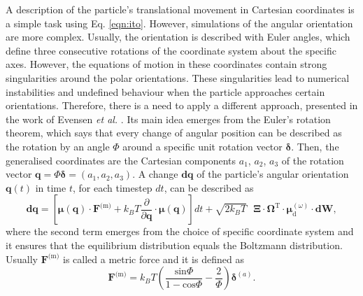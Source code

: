 \documentclass{master_thesis}
\begin{document}
A description of the particle's translational movement in Cartesian coordinates is a simple task using Eq. \eqref{eqn:ito}. However, simulations of the angular orientation are more complex. Usually, the orientation is described with Euler angles, which define three consecutive rotations of the coordinate system about the specific axes. However, the equations of motion in these coordinates contain strong singularities around the polar orientations. These singularities lead to numerical instabilities and undefined behaviour when the particle approaches certain orientations. Therefore, there is a need to apply a different approach, presented in the work of Evensen \textit{et al.} \cite{evensen2008}. Its main idea emerges from the Euler's rotation theorem, which says that every change of angular position can be described as the rotation by an angle $\Phi$ around a specific unit rotation vector $\bm{\delta}$. Then, the generalised coordinates are the Cartesian components $a_1$, $a_2$, $a_3$ of the rotation vector $\boldsymbol{q} = \Phi \bm{\delta} = \left( a_1, a_2, a_3 \right)$. A change $\boldsymbol{dq}$ of the particle's angular orientation $\boldsymbol{q}(t)$ in time $t$, for each timestep $dt$, can be described as
\begin{equation}
    \boldsymbol{dq} = \left[\bm{\mu}(\boldsymbol{q})\cdot \boldsymbol{F}^{\textrm{(m)}} + k_BT \frac{\partial}{\partial\boldsymbol{q}}\cdot\bm{\mu}(\boldsymbol{q}) \right] dt    +\sqrt{2k_BT}\textrm{ }\bm{\Xi}\cdot\bm{\Omega}^\textrm{T}\cdot\bm{\mu}^{(\omega)}_{\textrm{d}}\cdot\boldsymbol{dW},
\label{eqn:rotational_timestep}
\end{equation}
where the second term emerges from the choice of specific coordinate system and it ensures that the equilibrium distribution equals the Boltzmann distribution. Usually $\boldsymbol{F}^{\textrm{(m)}}$ is called a metric force and it is defined as
\begin{equation}
    \boldsymbol{F}^{\textrm{(m)}}=k_BT\left(\frac{\textrm{sin}\Phi}{1-\textrm{cos}\Phi}-\frac{2}{\Phi}\right)\bm{\delta}^{(a)}.
\label{eqn:metric_force}
\end{equation}
\end{document}
